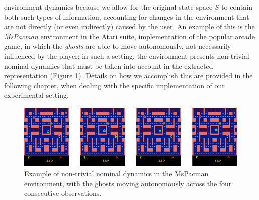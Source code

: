environment dynamics because we allow for the original state space $S$ to 
contain both such types of information, accounting for changes in the 
environment that are not directly (or even indirectly) caused by the user. 
An example of this is the \textit{MsPacman} environment in the Atari suite, 
implementation of the popular arcade game, in which the \textit{ghosts} are able
to move autonomously, not necessarily influenced by the player; in such a 
setting, the environment presents non-trivial nominal dynamics that must be 
taken into account in the extracted representation (Figure \ref{f:nominal_dyn}).
Details on how we accomplish this are provided in the following chapter, when 
dealing with the specific implementation of our experimental setting.
%
\begin{figure}
    \includegraphics[width=\textwidth]{pictures/nominal_dyn}
    \centering
    \caption[Example of non-trivial nominal dynamics]{Example of non-trivial 
	    nominal dynamics in the \textup{MsPacman} environment, with the 
	    ghosts moving autonomously across the four consecutive observations.}
    \label{f:nominal_dyn}
\end{figure}
%

